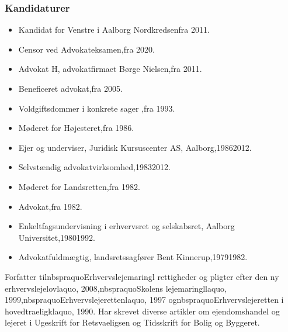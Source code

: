 \documentclass[11pt, a4paper]{awesome-cv}
\begin{document}
\begin{cvletter}
\subsubsection*{Kandidaturer}
\begin{itemize}
\item Kandidat for Venstre i Aalborg Nordkredsenfra 2011.
\end{itemize}
\begin{itemize}
\item Censor ved Advokateksamen,fra 2020.
\item Advokat H, advokatfirmaet Børge Nielsen,fra 2011.
\item Beneficeret advokat,fra 2005.
\item Voldgiftsdommer i konkrete sager ,fra 1993.
\item Møderet for Højesteret,fra 1986.
\item Ejer og underviser, Juridisk Kursuscenter AS, Aalborg,19862012.
\item Selvstændig advokatvirksomhed,19832012.
\item Møderet for Landsretten,fra 1982.
\item Advokat,fra 1982.
\item Enkeltfagsundervisning i erhvervsret og selskabsret, Aalborg Universitet,19801992.
\item Advokatfuldmægtig, landsretssagfører Bent Kinnerup,19791982.
\end{itemize}
Forfatter tilnbspraquoErhvervslejemaringl  rettigheder og pligter efter den ny erhvervslejelovlaquo, 2008,nbspraquoSkolens lejemaringllaquo, 1999,nbspraquoErhvervslejerettenlaquo, 1997 ognbspraquoErhvervslejeretten i hovedtraeligklaquo, 1990. Har skrevet diverse artikler om ejendomshandel og lejeret i Ugeskrift for Retsvaeligsen og Tidsskrift for Bolig og Byggeret.

\end{cvletter}
\end{document}
